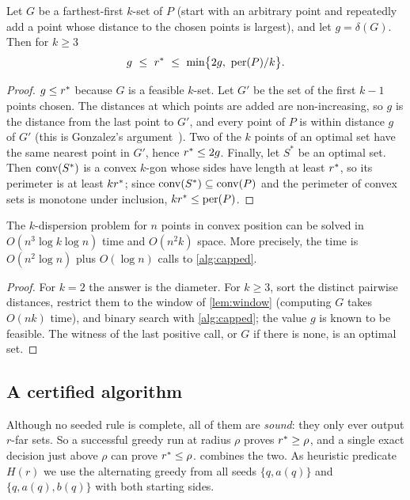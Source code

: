 \begin{lemma}\label{lem:window}
Let $G$ be a farthest-first $k$-set of $P$ (start with an arbitrary point and
repeatedly add a point whose distance to the chosen points is largest), and
let $g=\delta(G)$. Then for $k\ge3$
\[
g\ \le\ \rstar\ \le\ \min\bigl\{2g,\ \per(P)/k\bigr\}.
\]
\end{lemma}
\begin{proof}
$g\le r^{*}$ because $G$ is a feasible $k$-set. Let $G'$ be the set of the
first $k-1$ points chosen. The distances at which points are added are
non-increasing, so $g$ is the distance from the last point to $G'$, and every
point of $P$ is within distance $g$ of $G'$ (this is Gonzalez's
argument~\citep{gonzalez}). Two of the $k$ points of an optimal set have the
same nearest point in $G'$, hence $r^{*}\le2g$. Finally, let $S^*$ be an
optimal set. Then $\mathrm{conv}(S^*)$ is a convex $k$-gon whose sides have length at
least $r^{*}$, so its perimeter is at least $kr^{*}$; since
$\mathrm{conv}(S^*)\subseteq\mathrm{conv}(P)$ and the perimeter of convex sets is monotone
under inclusion, $kr^{*}\le\mathrm{per}(P)$.
\end{proof}

\begin{theorem}\label{thm:opt}
The $k$-dispersion problem for $n$ points in convex position can be solved in
$O(n^3\log k\log n)$ time and $O(n^2k)$ space. More precisely, the time is
$O(n^2\log n)$ plus $O(\log n)$ calls to \cref{alg:capped}.
\end{theorem}
\begin{proof}
For $k=2$ the answer is the diameter. For $k\ge3$, sort the distinct pairwise
distances, restrict them to the window of \cref{lem:window} (computing $G$
takes $O(nk)$ time), and binary search with \cref{alg:capped}; the value $g$
is known to be feasible. The witness of the last positive call, or $G$ if there
is none, is an optimal set.
\end{proof}

\subsection{A certified algorithm}\label{sec:certified}

Although no seeded rule is complete, all of them are \emph{sound}: they only
ever output $r$-far sets. So a successful greedy run at radius $\rho$ proves
$r^{*}\ge\rho$, and a single exact decision just above $\rho$ can prove
$r^{*}\le\rho$.  combines the two. As heuristic predicate
$H(r)$ we use the alternating greedy from all seeds $\{q,a(q)\}$ and
$\{q,a(q),b(q)\}$ with both starting sides.

